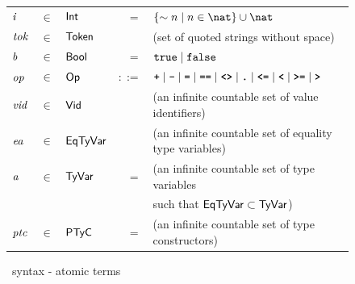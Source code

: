 \documentclass[final]{article}
\begin{document}
\begin{figure}[t]
\begin{small}
\begin{center}
  \begin{tabular}{lllrl}
    $\mathit{i}$
    & $\in$
    & $\mathsf{Int}$
    & $=$
    & $\{\sim n \mid n \in \nat\}\cup\nat$
    \\

    $\mathit{tok}$
    & $\in$
    & $\mathsf{Token}$
    &
    & (set of quoted strings without space)
    \\

    $\mathit{b}$
    & $\in$
    & $\mathsf{Bool}$
    & $=$
    & $\mathtt{true}\mid\mathtt{false}$
    \\

    $\mathit{op}$
    & $\in$
    & $\mathsf{Op}$
    & $::=$
    & $\textbf{\texttt{+}}
    \mid\textbf{\texttt{-}}
    \mid\textbf{\texttt{=}}
    \mid\textbf{\texttt{==}}
    \mid\textbf{\texttt{<>}}
    \mid\textbf{\texttt{.}}
    \mid\textbf{\texttt{<=}}
    \mid\textbf{\texttt{<}}
    \mid\textbf{\texttt{>=}}
    \mid\textbf{\texttt{>}}$
    \\

    $\mathit{vid}$
    & $\in$
    & $\mathsf{Vid}$
    &
    & (an infinite countable set of value identifiers)
    \\

    $\mathit{ea}$
    & $\in$
    & $\mathsf{EqTyVar}$
    &
    & (an infinite countable set of equality type variables)
    \\

    $\mathit{a}$
    & $\in$
    & $\mathsf{TyVar}$
    & $=$
    & (an infinite countable set of type variables
    \\
    &&&&
    \hspace*{0.05in}such that $\mathsf{EqTyVar}\subset\mathsf{TyVar}$)
    \\


    $\mathit{ptc}$
    & $\in$
    & $\mathsf{PTyC}$
    & $=$
    & (an infinite countable set of type constructors)
  \end{tabular}
\end{center}
\caption{\eml\ syntax - atomic terms}
\label{fig:esharp-syntax-atoms}
\end{small}
\end{figure}
\end{document}
